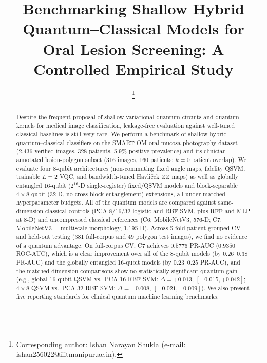 \documentclass[conference]{IEEEtran}
\begin{document}
\title{Benchmarking Shallow Hybrid Quantum--Classical Models for Oral Lesion Screening: A Controlled Empirical Study}

\author{
\thanks{\textsuperscript{\textsection}Corresponding author: Ishan Narayan Shukla (e-mail: \mbox{ishan256022@iiitmanipur.ac.in}).}
}

\maketitle

\begin{abstract}
Despite the frequent proposal of shallow variational quantum circuits and quantum kernels for medical image classification, leakage-free evaluation against well-tuned classical baselines is still very rare. We perform a benchmark of shallow hybrid quantum--classical classifiers on the SMART-OM oral mucosa photography dataset (2,436 verified images, 328 patients, 5.9\% positive prevalence) and its clinician-annotated lesion-polygon subset (316 images, 160 patients; $k=0$ patient overlap). We evaluate four 8-qubit architectures (non-commuting fixed angle maps, fidelity QSVM, trainable $L=2$ VQC, and bandwidth-tuned Havl{\'\i}{\v{c}}ek $ZZ$ maps) as well as globally entangled 16-qubit ($2^{16}$-D single-register) fixed/QSVM models and block-separable $4 \times 8$-qubit (32-D, no cross-block entanglement) extensions, all under matched hyperparameter budgets. All of the quantum models are compared against same-dimension classical controls (PCA-8/16/32 logistic and RBF-SVM, plus RFF and MLP at 8-D) and uncompressed classical references (C6: MobileNetV3, 576-D; C7: MobileNetV3 + multiscale morphology, 1,195-D). Across 5-fold patient-grouped CV and held-out testing (381 full-corpus and 49 polygon test images), we find no evidence of a quantum advantage. On full-corpus CV, C7 achieves $0.5776$ PR-AUC ($0.9350$ ROC-AUC), which is a clear improvement over all of the 8-qubit models (by $0.26$--$0.38$ PR-AUC) and the globally entangled 16-qubit models (by $0.23$--$0.25$ PR-AUC), and the matched-dimension comparisons show no statistically significant quantum gain (e.g., global 16-qubit QSVM vs.\ PCA-16 RBF-SVM: $\Delta = +0.013$, $[-0.015, +0.042]$; $4 \times 8$ QSVM vs.\ PCA-32 RBF-SVM: $\Delta = -0.008$, $[-0.021, +0.009]$). We also present five reporting standards for clinical quantum machine learning benchmarks.
\end{abstract}
\end{document}
